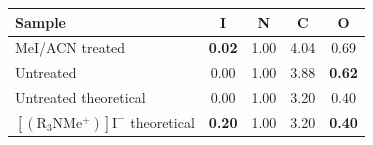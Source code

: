 \documentclass[border=2pt]{standalone}
\makeatletter
\renewenvironment{table}[1][]{%
    \begin{minipage}{\textwidth}\centering
    \def\@captype{table}%
}{%
    \end{minipage}%
}
\makeatother
\begin{document}

\begin{table}[htbp]
\centering
\caption{Elemental composition determined from XPS survey spectra. Atomic ratios are normalized to the total nitrogen concentration.}
\label{tab:XPSSurvey}

\renewcommand{\arraystretch}{1.25}

\begin{tabular}{lcccc}
\toprule
Sample & I & N & C & O \\
\midrule
MeI/ACN treated                      & \textbf{0.02} & 1.00 & 4.04 & 0.69 \\
Untreated                            & 0.00 & 1.00 & 3.88 & \textbf{0.62} \\
Untreated theoretical                & 0.00 & 1.00 & 3.20 & 0.40 \\
$[(\mathrm{R_3NMe^+})]\mathrm{I^-}$ theoretical
                                     & \textbf{0.20} & 1.00 & 3.20 & \textbf{0.40} \\
\bottomrule
\end{tabular}
\end{table}
\end{document}
